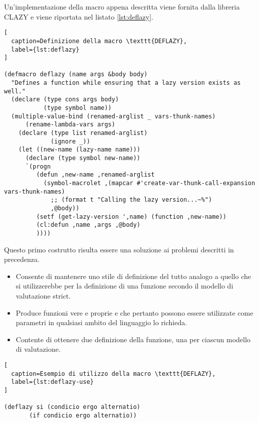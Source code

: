Un'implementazione della macro appena descritta viene fornita dalla libreria
CLAZY \cite{DBLP:journals/corr/Antoniotti14} e viene riportata nel listato
\ref{lst:deflazy}.

\begin{lstlisting}[
  caption=Definizione della macro \texttt{DEFLAZY},
  label={lst:deflazy}
]

(defmacro deflazy (name args &body body)
  "Defines a function while ensuring that a lazy version exists as well."
  (declare (type cons args body)
           (type symbol name))
  (multiple-value-bind (renamed-arglist _ vars-thunk-names)
      (rename-lambda-vars args)
    (declare (type list renamed-arglist)
             (ignore _))
    (let ((new-name (lazy-name name)))
      (declare (type symbol new-name))
      `(progn
         (defun ,new-name ,renamed-arglist
           (symbol-macrolet ,(mapcar #'create-var-thunk-call-expansion vars-thunk-names)
             ;; (format t "Calling the lazy version...~%")
             ,@body))
         (setf (get-lazy-version ',name) (function ,new-name))
         (cl:defun ,name ,args ,@body)
         ))))

\end{lstlisting}

Questo primo costrutto risulta essere una soluzione ai problemi descritti in
precedenza.

\begin{itemize}

\item Consente di mantenere uno stile di definizione del tutto analogo a quello
che si utilizzerebbe per la definizione di una funzione secondo il modello di
valutazione strict.

\item Produce funzioni vere e proprie e che pertanto possono essere utilizzate
come parametri in qualsiasi ambito del linguaggio lo richieda.

\item Contente di ottenere due definizione della funzione, una per ciascun
modello di valutazione.

\end{itemize}

\begin{lstlisting}[
  caption=Esempio di utilizzo della macro \texttt{DEFLAZY},
  label={lst:deflazy-use}
]

(deflazy si (condicio ergo alternatio)
       (if condicio ergo alternatio))

\end{lstlisting}

